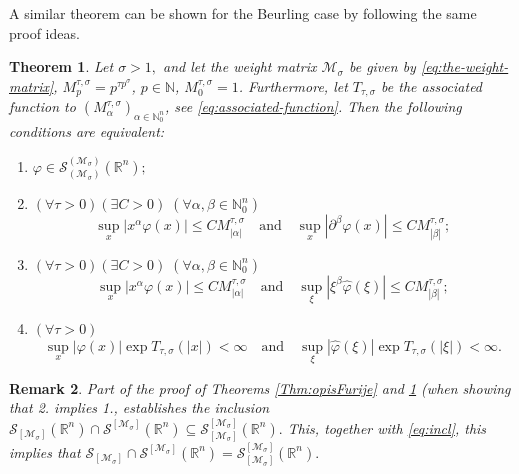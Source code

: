 \documentclass{article}
\theoremstyle{thmstyleone}
\newtheorem{Theorem}{Theorem}[section]%
\theoremstyle{thmstyletwo}%
\newtheorem{Remark}[Theorem]{Remark}%
\theoremstyle{thmstylethree}%
\begin{document}
A similar theorem can be shown for the Beurling case by following the same proof ideas.

\begin{Theorem} \label{Thm:opisFurijeB}
    Let $\sigma>1,$ and let the weight matrix $\mathcal{M}_\sigma$ be given by \eqref{eq:the-weight-matrix}, 
$ M_{p}^{\tau,\sigma}=p^{\tau p^\sigma}$, $ p\in \mathbb{N}$, $ M_0^{\tau,\sigma}=1$. Furthermore, let $T_{\tau,\sigma}$ be the associated function to $(M_{\alpha}^{\tau,\sigma})_{\alpha\in\mathbb N_0^n}$, see    \eqref{eq:associated-function}.
    Then the  following conditions are equivalent:
    \begin{enumerate}
        \item $\varphi\in \mathcal  S_{(\mathcal{M}_\sigma)}^{(\mathcal{M}_\sigma)} (\mathbb R^n);$
        \item $(\forall \tau>0)(\exists C>0)\;(\forall \alpha,\beta\in \mathbb N_0^n)$
        $$\sup_x|x^\alpha \varphi(x)|\leq C M^{\tau,\sigma}_{|\alpha|} \quad \text{and}\quad \sup_x|\partial^\beta \varphi(x)|\leq CM^{\tau,\sigma}_{|\beta|};$$
        \item $(\forall \tau>0)(\exists C>0)\;(\forall \alpha,\beta\in \mathbb N_0^n)$
        $$\sup_x|x^\alpha \varphi(x)|\leq C M^{\tau,\sigma}_{|\alpha|} \quad \text{and}\quad \sup_\xi|\xi^\beta \widehat\varphi(\xi)|\leq CM^{\tau,\sigma}_{|\beta|};$$
        \item $(\forall \tau>0)$
        $$\sup_x|\varphi(x)| \exp T_{\tau,\sigma}(|x|)<\infty \quad \text{and}\quad \sup_\xi|\widehat\varphi(\xi)| \exp T_{\tau,\sigma}(|\xi|)<\infty.$$
    \end{enumerate}
\end{Theorem}

\begin{Remark}
   Part of the proof of Theorems \ref{Thm:opisFurije} and \ref{Thm:opisFurijeB} (when showing that {\em  2.} 
   implies {\em 1.}, establishes the inclusion $\mathcal  S_{[\mathcal{M}_\sigma]} (\mathbb R^n) \cap \mathcal  S^{[\mathcal{M}_\sigma]} (\mathbb R^n) \subseteq \mathcal  S_{[\mathcal{M}_\sigma]}^{[\mathcal{M}_\sigma]} (\mathbb R^n).$ This, together with \eqref{eq:incl}, this implies that $\mathcal  S_{[\mathcal{M}_\sigma]} \cap \mathcal  S^{[\mathcal{M}_\sigma]} (\mathbb R^n) = \mathcal  S_{[\mathcal{M}_\sigma]}^{[\mathcal{M}_\sigma]} (\mathbb R^n).$
\end{Remark}

\end{document}
